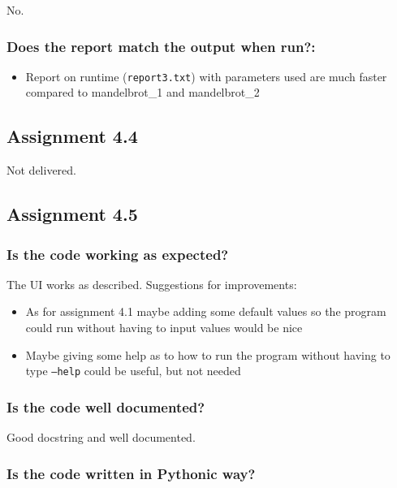 \documentclass[a4paper]{article}
\begin{document}
No.

\subsubsection*{Does the report match the output when run?:}
\begin{itemize}
	\item Report on runtime (\texttt{report3.txt}) with parameters used are much faster compared to mandelbrot\_1 and mandelbrot\_2
\end{itemize}

\subsection*{Assignment 4.4}

Not delivered.

\subsection*{Assignment 4.5}

\subsubsection*{Is the code working as expected?}

The UI works as described. Suggestions for improvements:
\begin{itemize}
	\item As for assignment 4.1 maybe adding some default values so the program could run without having to input values would be nice
	\item Maybe giving some help as to how to run the program without having to type \texttt{--help} could be useful, but not needed
\end{itemize}

\subsubsection*{Is the code well documented?}

Good docstring and well documented.

\subsubsection*{Is the code written in Pythonic way?}
\end{document}

